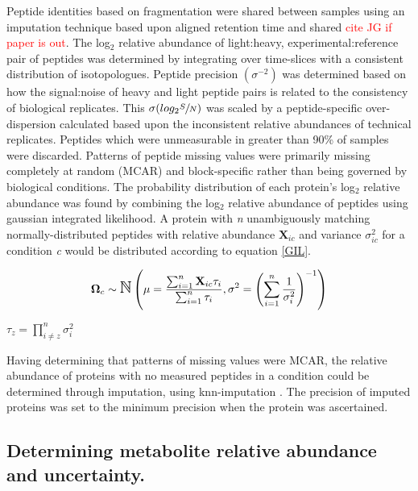 Peptide identities based on fragmentation were shared between samples using an imputation technique based upon aligned retention time and shared  \textcolor{red}{cite JG if paper is out}. The log$_{2}$ relative abundance of light:heavy, experimental:reference pair of peptides was determined by integrating over time-slices with a consistent distribution of isotopologues. Peptide precision $\left(\sigma^{-2}\right)$ was determined based on how the signal:noise of heavy and light peptide pairs is related to the consistency of biological replicates.  This $\sigma(log_{2}\sfrac{S}{N})$ was scaled by a peptide-specific over-dispersion calculated based upon the inconsistent relative abundances of technical replicates.  Peptides which were unmeasurable in greater than 90\% of samples were discarded.  Patterns of peptide missing values were primarily missing completely at random (MCAR) and block-specific rather than being governed by biological conditions.  The probability distribution of each protein's log$_{2}$ relative abundance was found by combining the log$_{2}$ relative abundance of peptides using gaussian integrated likelihood.  A protein with \textit{n} unambiguously matching normally-distributed peptides with relative abundance $\textbf{X}_{ic}$ and variance $\sigma^{2}_{ic}$ for a condition \textit{c} would be distributed according to equation \ref{GIL}.

\begin{align}
\boldsymbol{\Omega}_{c} \sim \mbox{\Large $\mathbb{N}$}\left(\mu = \frac{\sum_{i = 1}^{n}\textbf{X}_{ic}\tau_{i}}{\sum_{i = 1}^{n}\tau_{i}}, \sigma^{2} =  \left(\sum_{i = 1}^{n}\frac{1}{\sigma^{2}_{i}}\right)^{-1} \right)\label{GIL}
\end{align}

$\tau_{z} = \prod_{i \neq z}^{n}\sigma^{2}_{i}$

Having determining that patterns of missing values were MCAR, the relative abundance of proteins with no measured peptides in a condition could be determined through imputation, using knn-imputation \cite{Troyanskaya:2001uh}.  The precision of imputed proteins was set to the minimum precision when the protein was ascertained.

\subsection{Determining metabolite relative abundance and uncertainty.}


